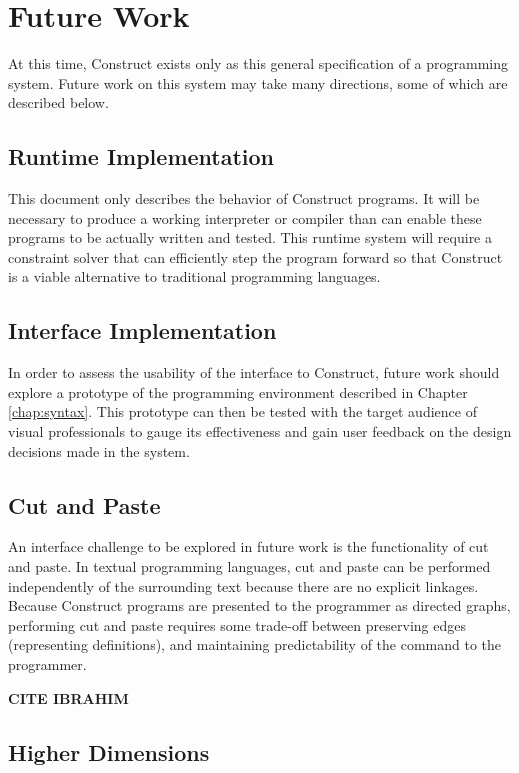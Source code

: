 \documentclass[twoside,openright,11pt]{report}
\begin{document}
\section{Future Work}
\label{sec:future}

At this time, Construct exists only as this general specification of a programming system. 
Future work on this system may take many directions, some of which are described below.

\subsection{Runtime Implementation}

This document only describes the behavior of Construct programs. 
It will be necessary to produce a working interpreter or compiler than can enable these programs to be actually written and tested. 
This runtime system will require a constraint solver that can efficiently step the program forward so that Construct is a viable alternative to traditional programming languages.

\subsection{Interface Implementation}

In order to assess the usability of the interface to Construct, future work should explore a prototype of the programming environment described in Chapter \ref{chap:syntax}.
This prototype can then be tested with the target audience of visual professionals to gauge its effectiveness and gain user feedback on the design decisions made in the system.

\subsection{Cut and Paste}

An interface challenge to be explored in future work is the functionality of cut and paste. 
In textual programming languages, cut and paste can be performed independently of the surrounding text because there are no explicit linkages.
Because Construct programs are presented to the programmer as directed graphs, performing cut and paste requires some trade-off between preserving edges (representing definitions), and maintaining predictability of the command to the programmer.

{\bf CITE IBRAHIM}

\subsection{Higher Dimensions}
\end{document}
